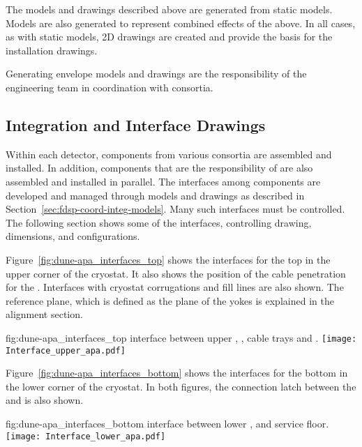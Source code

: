 The models and drawings described above are generated from static
models. Models are also generated to represent combined effects of the
above. In all cases, as with static models, 2D drawings are created
and provide the basis for the installation drawings.


Generating envelope models and drawings are the responsibility of the
 engineering team in coordination with consortia.


\subsection{Integration and Interface Drawings}
\label{sec:fdsp-coord-integ-drawings}

Within each detector, components from various consortia are assembled
and installed. In addition, components that are the responsibility of
 are also assembled and installed in parallel. The interfaces
among components are developed and managed through models and drawings
as described in Section~\ref{sec:fdsp-coord-integ-models}. Many such
interfaces must be controlled. The following section shows some of the
interfaces, controlling drawing, dimensions, and configurations.


Figure~\ref{fig:dune-apa_interfaces_top} shows the interfaces for the
top  in the upper corner of the cryostat. It also shows the position
of the cable penetration for the . Interfaces with cryostat
corrugations and  fill lines are also shown. The reference plane,
which is defined as the plane of the  yokes is explained in the
alignment section.
\begin{dunefigure}{fig:dune-apa_interfaces_top}
  { interface between upper , , cable
    trays and .}
  \texttt{[image: Interface\_upper\_apa.pdf]}
\end{dunefigure}


Figure~\ref{fig:dune-apa_interfaces_bottom} shows the interfaces for
the bottom  in the lower corner of the cryostat. In both figures,
the connection latch between the  and  is also
shown.
\begin{dunefigure}{fig:dune-apa_interfaces_bottom}
  { interface between lower ,  and 
    service floor.}
  \texttt{[image: Interface\_lower\_apa.pdf]}
\end{dunefigure}


